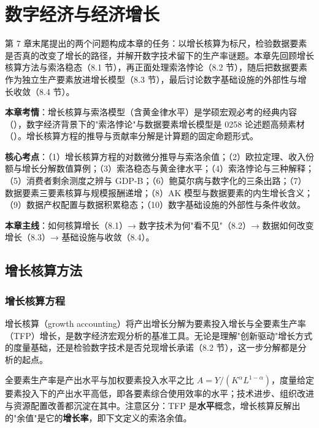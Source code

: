 \chapter{数字经济与经济增长}

第 7 章末尾提出的两个问题构成本章的任务：以增长核算为标尺，检验数据要素是否真的改变了增长的路径，并解开数字技术留下的生产率谜题。本章先回顾增长核算方法与索洛稳态（8.1 节），再正面处理索洛悖论（8.2 节），随后把数据要素作为独立生产要素放进增长模型（8.3 节），最后讨论数字基础设施的外部性与增长收敛（8.4 节）。

\begin{examguide}
\textbf{本章考情}：增长核算与索洛模型（含黄金律水平）是学硕宏观必考的经典内容（），数字经济背景下的"索洛悖论"与数据要素增长模型是 0258 论述题高频素材（）。增长核算方程的推导与贡献率分解是计算题的固定命题形式。

\textbf{核心考点}：（1）增长核算方程的对数微分推导与索洛余值；（2）欧拉定理、收入份额与增长分解数值算例；（3）索洛稳态与黄金律水平；（4）索洛悖论与三种解释；（5）消费者剩余测度之辨与 GDP-B；（6）鲍莫尔病与数字化的三条出路；（7）数据要素三要素核算与规模报酬递增；（8）AK 模型与数据要素的内生增长含义；（9）数据产权配置与数据积累稳态；（10）数字基础设施的外部性与条件收敛。

\textbf{本章主线}：如何核算增长（8.1）→ 数字技术为何"看不见"（8.2）→ 数据如何改变增长（8.3）→ 基础设施与收敛（8.4）。
\end{examguide}

\section{增长核算方法}

\subsection{增长核算方程}

增长核算（growth accounting）将产出增长分解为要素投入增长与全要素生产率（TFP）增长，是数字经济宏观分析的基准工具。无论是理解"创新驱动"增长方式的度量基础，还是检验数字技术是否兑现增长承诺（8.2 节），这一步分解都是分析的起点。

\begin{definition}
全要素生产率是产出水平与加权要素投入水平之比 $A = Y/(K^\alpha L^{1-\alpha})$，度量给定要素投入下的产出水平高低，即各要素综合使用效率的水平；技术进步、组织改进与资源配置改善都沉淀在其中。注意区分：TFP 是\textbf{水平}概念，增长核算反解出的"余值"是它的\textbf{增长率}，即下文定义的索洛余值。
\end{definition}

